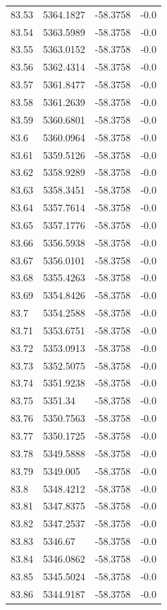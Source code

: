 \begin{table}[H]
\begin{tabular}{llll}
83.53 & 5364.1827 & -58.3758 & -0.0 \\
83.54 & 5363.5989 & -58.3758 & -0.0 \\
83.55 & 5363.0152 & -58.3758 & -0.0 \\
83.56 & 5362.4314 & -58.3758 & -0.0 \\
83.57 & 5361.8477 & -58.3758 & -0.0 \\
83.58 & 5361.2639 & -58.3758 & -0.0 \\
83.59 & 5360.6801 & -58.3758 & -0.0 \\
83.6 & 5360.0964 & -58.3758 & -0.0 \\
83.61 & 5359.5126 & -58.3758 & -0.0 \\
83.62 & 5358.9289 & -58.3758 & -0.0 \\
83.63 & 5358.3451 & -58.3758 & -0.0 \\
83.64 & 5357.7614 & -58.3758 & -0.0 \\
83.65 & 5357.1776 & -58.3758 & -0.0 \\
83.66 & 5356.5938 & -58.3758 & -0.0 \\
83.67 & 5356.0101 & -58.3758 & -0.0 \\
83.68 & 5355.4263 & -58.3758 & -0.0 \\
83.69 & 5354.8426 & -58.3758 & -0.0 \\
83.7 & 5354.2588 & -58.3758 & -0.0 \\
83.71 & 5353.6751 & -58.3758 & -0.0 \\
83.72 & 5353.0913 & -58.3758 & -0.0 \\
83.73 & 5352.5075 & -58.3758 & -0.0 \\
83.74 & 5351.9238 & -58.3758 & -0.0 \\
83.75 & 5351.34 & -58.3758 & -0.0 \\
83.76 & 5350.7563 & -58.3758 & -0.0 \\
83.77 & 5350.1725 & -58.3758 & -0.0 \\
83.78 & 5349.5888 & -58.3758 & -0.0 \\
83.79 & 5349.005 & -58.3758 & -0.0 \\
83.8 & 5348.4212 & -58.3758 & -0.0 \\
83.81 & 5347.8375 & -58.3758 & -0.0 \\
83.82 & 5347.2537 & -58.3758 & -0.0 \\
83.83 & 5346.67 & -58.3758 & -0.0 \\
83.84 & 5346.0862 & -58.3758 & -0.0 \\
83.85 & 5345.5024 & -58.3758 & -0.0 \\
83.86 & 5344.9187 & -58.3758 & -0.0 \\

\end{tabular}
\end{table}
